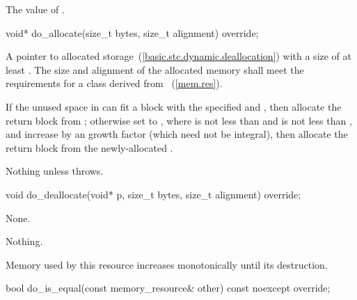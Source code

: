 \begin{itemdescr}
\pnum
\returns
The value of .
\end{itemdescr}

%
\begin{itemdecl}
void* do_allocate(size_t bytes, size_t alignment) override;
\end{itemdecl}

\begin{itemdescr}
\pnum
\returns
A pointer to allocated storage~(\ref{basic.stc.dynamic.deallocation})
with a size of at least .
The size and alignment of the allocated memory shall meet the requirements
for a class derived from ~(\ref{mem.res}).

\pnum
\effects
If the unused space in 
can fit a block with the specified  and ,
then allocate the return block from ;
otherwise set  to ,
where  is not less than  and
 is not less than ,
and increase 
by an  growth factor (which need not be integral),
then allocate the return block from the newly-allocated .

\pnum
\throws
Nothing unless  throws.
\end{itemdescr}

%
\begin{itemdecl}
void do_deallocate(void* p, size_t bytes, size_t alignment) override;
\end{itemdecl}

\begin{itemdescr}
\pnum
\effects
None.

\pnum
\throws
Nothing.

\pnum
\remarks
Memory used by this resource increases monotonically until its destruction.
\end{itemdescr}

%
\begin{itemdecl}
bool do_is_equal(const memory_resource& other) const noexcept override;
\end{itemdecl}

